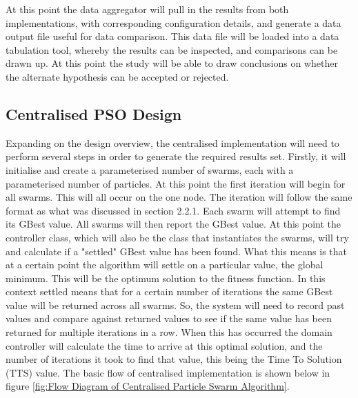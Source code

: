 \documentclass[oneside,12pt]{book}
\begin{document}
At this point the data aggregator will pull in the results from both implementations, with corresponding configuration details, and generate a data output file useful for data comparison. This data file will be loaded into a data tabulation tool, whereby the results can be inspected, and comparisons can be drawn up. At this point the study will be able to draw conclusions on whether the alternate hypothesis can be accepted or rejected.  

\subsection{Centralised PSO Design}
Expanding on the design overview, the centralised implementation will need to perform several steps in order to generate the required results set. Firstly, it will initialise and create a parameterised number of swarms, each with a parameterised number of particles. At this point the first iteration will begin for all swarms. This will all occur on the one node. The iteration will follow the same format as what was discussed in section 2.2.1. Each swarm will attempt to find its GBest value. All swarms will then report the GBest value. At this point the controller class, which will also be the class that instantiates the swarms, will try and calculate if a "settled" GBest value has been found. What this means is that at a certain point the algorithm will settle on a particular value, the global minimum. This will be the optimum solution to the fitness function. In this context settled means that for a certain number of iterations the same GBest value will be returned across all swarms. So, the system will need to record past values and compare against returned values to see if the same value has been returned for multiple iterations in a row. When this has occurred the domain controller will calculate the time to arrive at this optimal solution, and the number of iterations it took to find that value, this being the Time To Solution (TTS) value. 
The basic flow of centralised implementation is shown below in figure \ref{fig:Flow Diagram of Centralised Particle Swarm Algorithm}. 
\end{document}
